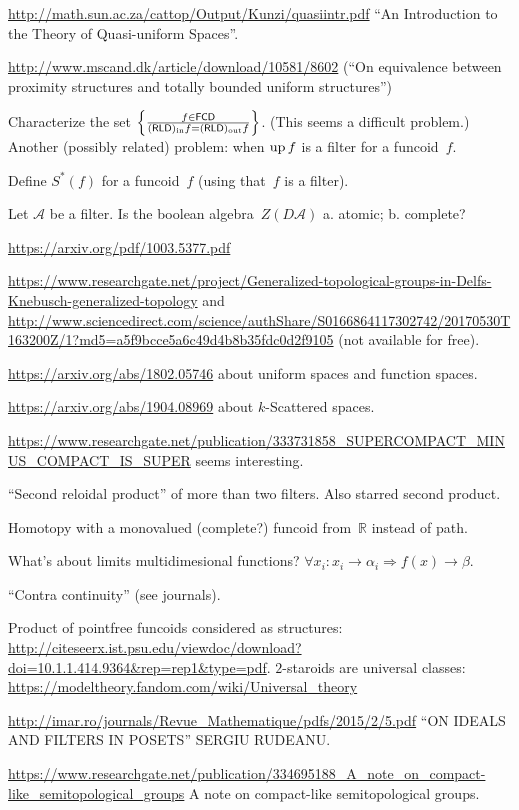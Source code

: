 \documentclass{amsart}
\begin{document}
\url{http://math.sun.ac.za/cattop/Output/Kunzi/quasiintr.pdf} ``An Introduction to the Theory of Quasi-uniform Spaces''.

\url{http://www.mscand.dk/article/download/10581/8602} (``On equivalence between proximity structures and totally bounded uniform structures'')

Characterize the set $\left\{ \frac{f\in\mathsf{FCD}}{(\mathsf{RLD})_{\mathrm{in}} f=(\mathsf{RLD})_{\mathrm{out}} f}\right\}$. (This seems a difficult problem.)
Another (possibly related) problem: when $\operatorname{up} f$ is a filter for a funcoid~$f$.

Define $S^\ast (f)$ for a funcoid~$f$ (using that~$f$ is a filter).

Let $\mathcal{A}$ be a filter. Is the boolean algebra~$Z(D\mathcal{A})$
a. atomic; b. complete?

\url{https://arxiv.org/pdf/1003.5377.pdf}

\url{https://www.researchgate.net/project/Generalized-topological-groups-in-Delfs-Knebusch-generalized-topology}
and
\url{http://www.sciencedirect.com/science/authShare/S0166864117302742/20170530T163200Z/1?md5=a5f9bcce5a6c49d4b8b35fdc0d2f9105}
(not available for free).

\url{https://arxiv.org/abs/1802.05746} about uniform spaces and
function spaces.

\url{https://arxiv.org/abs/1904.08969} about $k$-Scattered spaces.

\url{https://www.researchgate.net/publication/333731858_SUPERCOMPACT_MINUS_COMPACT_IS_SUPER}
seems interesting.

``Second reloidal product'' of more than two filters.
Also starred second product.

Homotopy with a monovalued (complete?) funcoid from~$\mathbb{R}$
instead of path.

What's about limits multidimesional functions? $\forall x_i : x_i \rightarrow
\alpha_i \Rightarrow f (x) \rightarrow \beta$.

``Contra continuity'' (see journals).

Product of pointfree funcoids considered as structures:
\url{http://citeseerx.ist.psu.edu/viewdoc/download?doi=10.1.1.414.9364&rep=rep1&type=pdf}.
$2$-staroids are universal classes: \url{https://modeltheory.fandom.com/wiki/Universal_theory}

\url{http://imar.ro/journals/Revue_Mathematique/pdfs/2015/2/5.pdf}
``ON IDEALS AND FILTERS IN POSETS'' SERGIU RUDEANU.

\url{https://www.researchgate.net/publication/334695188_A_note_on_compact-like_semitopological_groups}
A note on compact-like semitopological groups.
\end{document}
